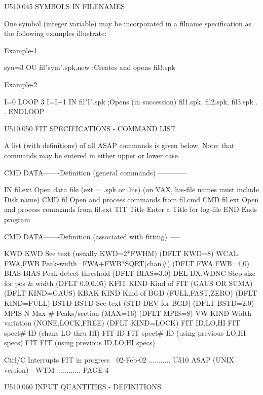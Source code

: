  
 
   U510.045  SYMBOLS IN FILENAMES
 
   One   symbol   (integer   variable)   may  be  incorporated  in  a  filname
   specification as the following examples illustrate:
 
   Example-1
 
   syn=3
   OU fil"sym".spk,new  ;Creates and opens fil3.spk
 
   Example-2
 
   I=0
   LOOP 3
   I=I+1
   IN fil"I".spk        ;Opens (in succession)  fil1.spk, fil2.spk, fil3.spk
   .
   .
   ENDLOOP
 
   U510.050  FIT SPECIFICATIONS - COMMAND LIST
 
   A list (with definitions) of all ASAP commands is given below.  Note:  that
   commands may be entered in either upper or lower case.
 
   CMD   DATA-------Definition (general commands) ------------
 
   IN    fil.ext    Open data file (ext = .spk or .his)
                    (on VAX, his-file names must include Disk name)
   CMD   fil        Open and process commands from fil.cmd
   CMD   fil.ext    Open and process commands from fil.ext
   TIT   Title      Enter a Title for log-file
   END              Ends program
 
   CMD   DATA-------Definition (associated with fitting) -----
 
   KWD   KWD        See text (usually KWD=2*FWHM)     (DFLT KWD=8)
   WCAL  FWA,FWB    Peak-width=FWA+FWB*SQRT(chan#)    (DFLT FWA,FWB=4,0)
   BIAS  BIAS       Peak-detect threshold             (DFLT BIAS=3.0)
   DEL   DX,WDNC    Step size for pos & width         (DFLT 0.0,0.05)
   KFIT  KIND       Kind of FIT (GAUS OR SUMA)        (DFLT KIND=GAUS)
   KBAK  KIND       Kind of BGD (FULL,FAST,ZERO)      (DFLT KIND=FULL)
   BSTD  BSTD       See text (STD DEV for BGD)        (DFLT BSTD=2.0)
   MPIS  N          Max # Peaks/section (MAX=16)      (DFLT MPIS=8)
   VW    KIND       Width variation (NONE,LOCK,FREE)  (DFLT KIND=LOCK)
   FIT   ID,LO,HI   FIT spect# ID   (chans LO thru HI)
   FIT   ID         FIT spect# ID   (using previous    LO,HI specs)
   FIT              FIT             (using previous ID,LO,HI specs)
 
   Ctrl/C           Interrupts FIT in progress
    
   02-Feb-02 ........... U510  ASAP (UNIX version) - WTM ............ PAGE   4
 
 
 
   U510.060  INPUT QUANTITIES - DEFINITIONS
 
